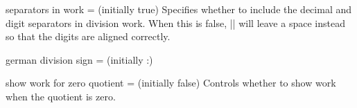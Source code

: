 \documentclass{ltxdoc}
\begin{document}
\begin{key}{separators in work =  (initially true)}
Specifies whether to include the decimal and digit separators in division work. When this is false, |\longdivision| will leave a space instead so that the digits are aligned correctly. \begin{tcblisting}{}
 \quad
{}
\end{tcblisting}
\end{key}

\begin{key}{german division sign =  (initially :)}
\begin{tcblisting}{}
 \quad
{}
\end{tcblisting}
\end{key}

\begin{key}{show work for zero quotient =  (initially false)}
Controls whether to show work when the quotient is zero.
\begin{tcblisting}{}
 \quad
{}
\end{tcblisting}
\end{key}
\end{document}
